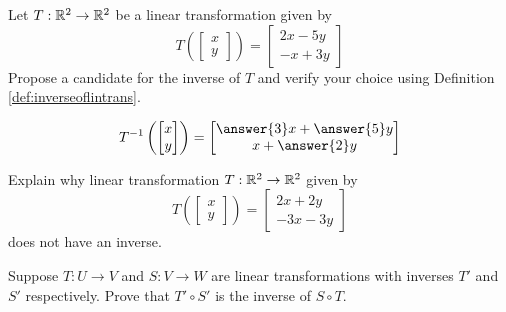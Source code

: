 \documentclass{ximera}
\begin{document}
\begin{problem}\label{prob:candidateforinv}
Let $T:\mathbb{R}^2\rightarrow \mathbb{R}^2$ be a linear transformation given by 
$$T\left(\begin{bmatrix}x\\y\end{bmatrix}\right)=\begin{bmatrix}2x-5y\\-x+3y\end{bmatrix}$$
Propose a candidate for the inverse of $T$ and verify your choice using Definition \ref{def:inverseoflintrans}.

$$T^{-1}\left(\begin{bmatrix}x\\y\end{bmatrix}\right)=\begin{bmatrix}\answer{3}x+\answer{5}y\\x+\answer{2}y\end{bmatrix}$$
\end{problem}

\begin{problem}\label{prob:noinversetrans}Explain why linear transformation $T:\mathbb{R}^2\rightarrow\mathbb{R}^2$ given by $$T\left(\begin{bmatrix}x\\y\end{bmatrix}\right)=\begin{bmatrix}2x+2y\\-3x-3y\end{bmatrix}$$ does not have an inverse.
\end{problem}


\begin{problem}\label{prob:compofinvisinvofcomp} Suppose $T:U\rightarrow V$ and $S:V\rightarrow W$ are linear transformations with inverses $T'$ and $S'$ respectively.  Prove that $T'\circ S'$ is the inverse of $S\circ T$.
\end{problem}
\end{document}
